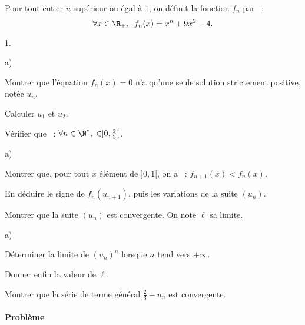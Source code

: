 \documentclass[11pt]{article}%
\begin{document}
Pour tout entier $n$ supérieur ou égal à $1$, on définit la fonction 
$f_{n}$ par~ : 
\[
\forall x \in \R_+,\;\; f_{n}(x) = x^{n} + 9x^{2}-4.
\]

\begin{noliste}{1.}
 \setlength{\itemsep}{4mm}
\item 
\begin{noliste}{a)}
 \setlength{\itemsep}{2mm}
\item Montrer que l'équation $f_{n}(x) = 0$ n'a qu'une seule solution
strictement positive, notée $u_{n}$.

\item Calculer $u_{1}$ et $u_{2}$.

\item Vérifier que~ : $\forall n \in \N^*,\; \in]0,\frac{2}{3}[$.
\end{noliste}

\item 
\begin{noliste}{a)}
 \setlength{\itemsep}{2mm}
\item Montrer que, pour tout $x$ élément de $]0,1[$, on a~ : $f_{n +
1}(x)<f_{n}(x)$.

\item En déduire le signe de $f_{n}(u_{n + 1})$, puis les variations de
la
suite $(u_{n})$.

\item Montrer que la suite $(u_{n})$ est convergente. On note $\ell $
sa
limite.
\end{noliste}

\item 
\begin{noliste}{a)}
 \setlength{\itemsep}{2mm}
\item Déterminer la limite de $(u_{n})^{n}$ lorsque $n$ tend vers $ +
\infty$.

\item Donner enfin la valeur de $\ell $.
\end{noliste}

\item Montrer que la série de terme général $\frac{2}{3}-u_{n}$ est
convergente.
\end{noliste}

\vspace{0.5cm} 

\paragraph{ Problème}
\end{document}
